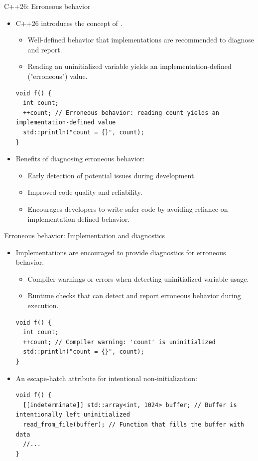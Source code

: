 \begin{frame}[t,fragile]{C++26: Erroneous behavior}
	\begin{itemize}
		\item C++26 introduces the concept of .
      \begin{itemize}
        \item Well-defined behavior that implementations are recommended to diagnose and report.
        \item Reading an uninitialized variable yields an implementation-defined ("erroneous") value.
      \end{itemize}
\begin{lstlisting}
void f() {
  int count;
  ++count; // Erroneous behavior: reading count yields an implementation-defined value
  std::println("count = {}", count);
}
\end{lstlisting}

		\item Benefits of diagnosing erroneous behavior:
      \begin{itemize}
        \item Early detection of potential issues during development.
        \item Improved code quality and reliability.
        \item Encourages developers to write safer code by avoiding reliance on implementation-defined behavior.
      \end{itemize}
	\end{itemize}
\end{frame}

\begin{frame}[t,fragile]{Erroneous behavior: Implementation and diagnostics}
\begin{itemize}
  \item Implementations are encouraged to provide diagnostics for erroneous behavior.
    \begin{itemize}
      \item Compiler warnings or errors when detecting uninitialized variable usage.
      \item Runtime checks that can detect and report erroneous behavior during execution.
    \end{itemize}
\begin{lstlisting}
void f() {
  int count;
  ++count; // Compiler warning: 'count' is uninitialized
  std::println("count = {}", count);
}
\end{lstlisting}

    \item An escape-hatch attribute for intentional non-initialization:
\begin{lstlisting}
void f() {
  [[indeterminate]] std::array<int, 1024> buffer; // Buffer is intentionally left uninitialized
  read_from_file(buffer); // Function that fills the buffer with data
  //...
}
\end{lstlisting}
\end{itemize}
\end{frame}